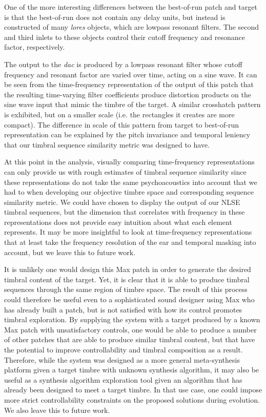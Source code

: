 \documentclass[a4paper,12pt]{report} 	%
\numberwithin{figure}{chapter}
\numberwithin{table}{chapter}
\numberwithin{equation}{chapter}
\begin{document}
\begin{flushleft}
One of the more interesting differences between the best-of-run patch and target is that the best-of-run does not contain any delay units, but instead is constructed of many \emph{lores\texttildelow{}} objects, which are lowpass resonant filters. The second and third inlets to these objects control their cutoff frequency and resonance factor, respectively.

The output to the \emph{dac\texttildelow{}} is produced by a lowpass resonant filter whose cutoff frequency and resonant factor are varied over time, acting on a sine wave. It can be seen from the time-frequency representation of the output of this patch that the resulting time-varying filter coefficients produce distortion products on the sine wave input that mimic the timbre of the target. A similar crosshatch pattern is exhibited, but on a smaller scale (i.e. the rectangles it creates are more compact). The difference in scale of this pattern from target to best-of-run representation can be explained by the pitch invariance and temporal leniency that our timbral sequence similarity metric was designed to have.

At this point in the analysis, visually comparing time-frequency representations can only provide us with rough estimates of timbral sequence similarity since these representations do not take the same psychoacoustics into account that we had to when developing our objective timbre space and corresponding sequence similarity metric. We could have chosen to display the output of our NLSE timbral sequences, but the dimension that correlates with frequency in these representations does not provide easy intuition about what each element represents. It may  be more insightful to look at time-frequency representations that at least take the frequency resolution of the ear and temporal masking into account, but we leave this to future work.

It is unlikely one would design this Max patch in order to generate the desired timbral content of the target. Yet, it is clear that it is able to produce timbral sequences through the same region of timbre space. The result of this process could therefore be useful even to a sophisticated sound designer using Max who has already built a patch, but is not satisfied with how its control promotes timbral exploration. By supplying the system with a target produced by a known Max patch with unsatisfactory controls, one would be able to produce a number of other patches that are able to produce similar timbral content, but that have the potential to improve controllability and timbral composition as a result. Therefore, while the system was designed as a more general meta-synthesis platform given a target timbre with unknown synthesis algorithm, it may also be useful as a synthesis algorithm exploration tool given an algorithm that has already been designed to meet a target timbre. In that use case, one could impose more strict controllability constraints on the proposed solutions during evolution. We also leave this to future work.


\end{flushleft}
\end{document}
